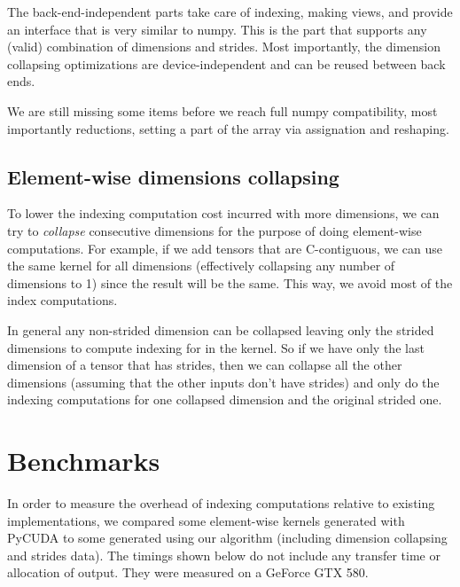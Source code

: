 \documentclass{article} %
\begin{document}
The back-end-independent parts take care of indexing, making views, and provide an interface that is very similar to numpy.
This is the part that supports any (valid) combination of dimensions and strides.
Most importantly, the dimension collapsing optimizations are device-independent and can be reused between back ends.

We are still missing some items before we reach full numpy compatibility, most importantly reductions, setting a part of the array via assignation and reshaping.

\subsection{Element-wise dimensions collapsing}

To lower the indexing computation cost incurred with more dimensions, we can try to \emph{collapse} consecutive dimensions for the purpose of doing element-wise computations.
For example, if we add tensors that are C-contiguous, we can use the same kernel for all dimensions (effectively collapsing any number of dimensions to 1) since the result will be the same.
This way,  we avoid most of the index computations.

In general any non-strided dimension can be collapsed leaving only the strided dimensions to compute indexing for in the kernel.
So if we have only the last dimension of a tensor that has strides, then we can collapse all the other dimensions (assuming that the other inputs don't have strides) and only do the indexing computations for one collapsed dimension and the original strided one.

\section{Benchmarks}

In order to measure the overhead of indexing computations relative to existing implementations, we compared some element-wise kernels generated with PyCUDA to some generated using our algorithm (including dimension collapsing and strides data).
The timings shown below do not include any transfer time or allocation of output.
They were measured on a GeForce GTX 580.
\end{document}

